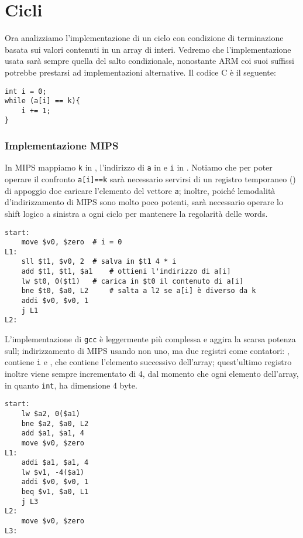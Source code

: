\documentclass[class=book, crop=false, oneside]{standalone}
\begin{document}
\section{Cicli}
Ora analizziamo l'implementazione di un ciclo con condizione di terminazione basata sui valori contenuti in un array di interi. Vedremo che l'implementazione usata sarà sempre quella del salto condizionale, nonostante ARM coi suoi suffissi potrebbe prestarsi ad implementazioni alternative. Il codice C è il seguente:
\begin{verbatim}
int i = 0;
while (a[i] == k){
	i += 1;
}
\end{verbatim}

\subsubsection{Implementazione MIPS}
In MIPS mappiamo \texttt{k} in , l'indirizzo di \texttt{a} in e \texttt{i} in . Notiamo che per poter operare il confronto \texttt{a[i]==k} sarà necessario servirsi di un registro temporaneo () di appoggio doe caricare l'elemento del vettore \texttt{a}; inoltre, poiché lemodalità d'indirizzamento di MIPS sono molto poco potenti, sarà necessario operare lo shift logico a sinistra a ogni ciclo per mantenere la regolarità delle words.
\begin{verbatim}
start:
	move $v0, $zero	 # i = 0
L1:
	sll $t1, $v0, 2	 # salva in $t1 4 * i
	add $t1, $t1, $a1	 # ottieni l'indirizzo di a[i]
	lw $t0, 0($t1)	 # carica in $t0 il contenuto di a[i]
	bne $t0, $a0, L2	 # salta a l2 se a[i] è diverso da k
	addi $v0, $v0, 1
	j L1
L2:
\end{verbatim}

L'implementazione di \texttt{gcc} è leggermente più complessa e aggira la scarsa potenza sull; indirizzamento di MIPS usando non uno, ma due registri come contatori: , contiene \texttt{i} e , che contiene l'elemento successivo dell'array; quest'ultimo registro inoltre viene sempre incrementato di 4, dal momento che ogni elemento dell'array, in quanto \texttt{int}, ha dimensione 4 byte.
\begin{verbatim}
start:
	lw $a2, 0($a1)
	bne $a2, $a0, L2
	add $a1, $a1, 4
	move $v0, $zero
L1:
	addi $a1, $a1, 4
	lw $v1, -4($a1)
	addi $v0, $v0, 1
	beq $v1, $a0, L1
	j L3
L2:
	move $v0, $zero
L3:
\end{verbatim}
\end{document}
